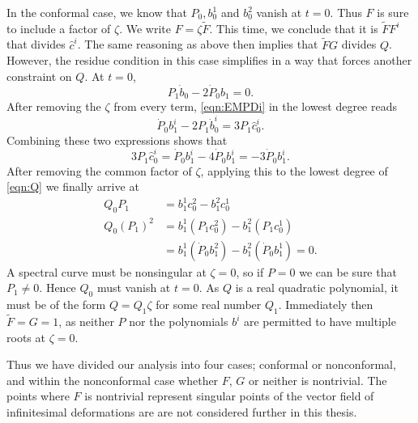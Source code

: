 In the conformal case, we know that $P_0, b^1_0$ and $b^2_0$ vanish at $t=0$. Thus $F$ is sure to include a factor of $ζ$. We write $F = ζ\tilde{F}$. This time, we conclude that it is $\tilde{F}F^i$ that divides $\hat{c}^i$. The same reasoning as above then implies that $\tilde{F}G$ divides $Q$. However, the residue condition in this case simplifies in a way that forces another constraint on $Q$. At $t=0$,
\[
P_1 \dot{b}_0 - 2 \dot{P}_0 b_1 = 0.
\]
After removing the $ζ$ from every term, \eqref{eqn:EMPDi} in the lowest degree reads
\[
\dot P_0 b_1^i - 2P_1\dot b_0^i = 3P_1\hat{c}_0^i.
\]
Combining these two expressions shows that
\[
3P_1\hat{c}_0^i = \dot P_0 b_1^i - 4\dot{P}_0 b_1^i = -3\dot{P}_0 b_1^i.
\]
After removing the common factor of $ζ$, applying this to the lowest degree of \eqref{eqn:Q} we finally arrive at
\begin{align*}
Q_0 P_1 &= b^1_1 c^2_0 - b^2_1 c^1_0 \\
Q_0 (P_1)^2 &= b^1_1 (P_1 c^2_0) - b^2_1 (P_1 c^1_0) \\
&= b^1_1 (\dot{P}_0 b^2_1) - b^2_1 (\dot{P}_0 b^1_1) = 0.
\end{align*}
A spectral curve must be nonsingular at $ζ=0$, so if $P=0$ we can be sure that $P_1\neq 0$. Hence $Q_0$ must vanish at $t=0$. As $Q$ is a real quadratic polynomial, it must be of the form $Q=Q_1 ζ$ for some real number $Q_1$. Immediately then $\tilde{F} = G = 1$, as neither $P$ nor the polynomials $b^i$ are permitted to have multiple roots at $ζ=0$.

Thus we have divided our analysis into four cases; conformal or nonconformal, and within the nonconformal case whether $F$, $G$ or neither is nontrivial. The points where $F$ is nontrivial represent singular points of the vector field of infinitesimal deformations are are not considered further in this thesis.

